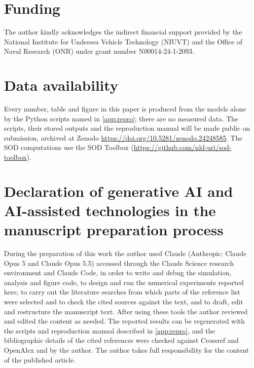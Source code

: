 \documentclass[preprint,12pt]{elsarticle}
\begin{document}
\section*{Funding}
The author kindly acknowledges the indirect financial support provided by the National Institute for Undersea Vehicle Technology (NIUVT) and the Office of Naval Research (ONR) under grant number N00014-24-1-2093.

\section*{Data availability}
Every number, table and figure in this paper is produced from the models alone by the Python scripts named in \ref{app:repro}; there are no measured data. The scripts, their stored outputs and the reproduction manual will be made public on submission, archived at Zenodo \url{https://doi.org/10.5281/zenodo.24248585}. The SOD computations use the SOD Toolbox (\url{https://github.com/nld-uri/sod-toolbox}).

\section*{Declaration of generative AI and AI-assisted technologies in the manuscript preparation process}
During the preparation of this work the author used Claude (Anthropic; Claude Opus 5 and Claude Opus 5.5) accessed through the Claude Science research environment and Claude Code, in order to write and debug the simulation, analysis and figure code, to design and run the numerical experiments reported here, to carry out the literature searches from which parts of the reference list were selected and to check the cited sources against the text, and to draft, edit and restructure the manuscript text. After using these tools the author reviewed and edited the content as needed. The reported results can be regenerated with the scripts and reproduction manual described in \ref{app:repro}, and the bibliographic details of the cited references were checked against Crossref and OpenAlex and by the author. The author takes full responsibility for the content of the published article.



\end{document}
